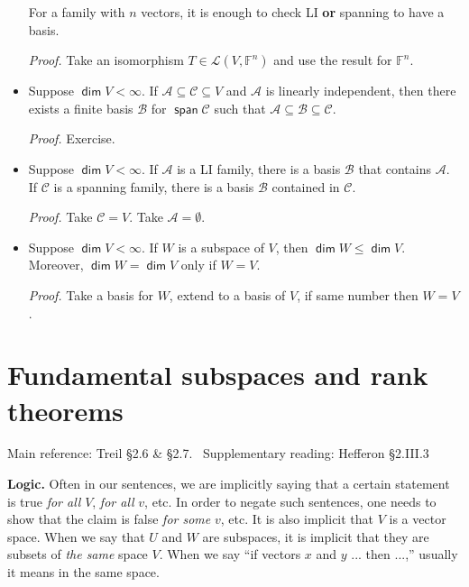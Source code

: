 \documentclass[11pt]{article}
\newcommand{\1}{\mathbf{1}}
\newcommand{\0}{\mathbf{0}}
\newcommand{\A}{\mathcal{A}}
\newcommand{\B}{\mathcal{B}}
\newcommand{\cC}{\mathcal{C}}
\newcommand{\F}{\mathbb{F}}
\newcommand{\cL}{\mathcal{L}}
\DeclareMathOperator{\myspan}{\mathsf{span}}
\DeclareMathOperator{\mydim}{\mathsf{dim}}
\renewcommand{\leq}{\leqslant}
\newcommand{\spitem}{\item[$\circ$]}
\begin{document}
\begin{itemize}
For a family with $n$ vectors, it is enough to check LI \textbf{or} spanning to have a basis.

\emph{Proof.}
Take an isomorphism $T\in\cL(V,\F^n)$ and use the result for $\F^n$.

\spitem

Suppose $\mydim V < \infty$.
If $\A \subseteq \cC \subseteq V$ and $\A$ is linearly independent, then there exists a finite basis $\B$ for $\myspan \cC$ such that $\A \subseteq \B \subseteq \cC$.

\emph{Proof.}
Exercise.

\spitem

Suppose $\mydim V < \infty$.
If $\A$ is a LI family, there is a basis $\B$ that contains $\A$.
\\
If $\cC$ is a spanning family, there is a basis $\B$ contained in $\cC$.

\emph{Proof.}
Take $\cC=V$.
Take $\A=\emptyset$.

\item
Suppose $\mydim V < \infty$.
If $W$ is a subspace of $V$, then $\mydim W \leq \mydim V$.
Moreover, $\mydim W = \mydim V$ only if $W=V$.

\emph{Proof.}
Take a basis for $W$, extend to a basis of $V$, if same number then $W=V$.

\end{itemize}


\clearpage
\section{Fundamental subspaces and rank theorems}
\label{sec:rank}

Main reference:
Treil
\S2.6
\& 
\S2.7.
\
Supplementary reading:
Hefferon \S 2.III.3

\textbf{Logic.}
Often in our sentences, we are implicitly saying that a certain statement is true \emph{for all} $V$, \emph{for all} $v$, etc.
In order to negate such sentences, one needs to show that the claim is false \emph{for some} $v$, etc.
It is also implicit that $V$ is a vector space.
When we say that $U$ and $W$ are subspaces, it is implicit that they are subsets of \emph{the same} space $V$.
When we say ``if vectors $x$ and $y$ ... then ...,'' usually it means in the same space.
\end{document}
